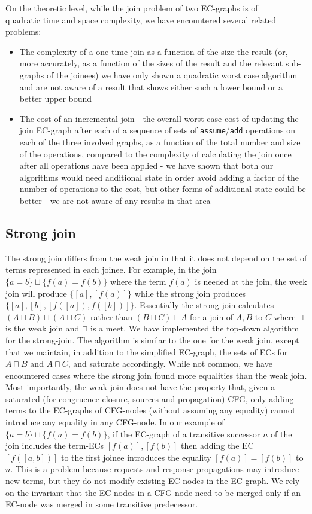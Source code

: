 On the theoretic level, while the join problem of two EC-graphs is of \\ quadratic time and space complexity, 
we have encountered several related problems:

\begin{itemize}
	\item The complexity of a one-time join as a function of the size the result (or, more accurately, as a function of the sizes of the result and the relevant sub-graphs of the joinees) we have only shown a quadratic worst case algorithm and are not aware of a result that shows either such a lower bound or a better upper bound
	\item The cost of an incremental join - the overall worst case cost of updating the join EC-graph after each of a sequence of sets of \lstinline{assume}/\lstinline{add} operations on each of the three involved graphs, as a function of the total number and size of the operations, compared to the complexity of calculating the join once after all operations have been applied - we have shown that both our algorithms would need additional state in order avoid adding a factor of the number of operations to the cost, 
	but other forms of additional state could be better - we are not aware of any results in that area
\end{itemize}

\newpage
\subsection{Strong join}
The strong join differs from the weak join in that it does not depend on the set of terms represented in each joinee.
For example, in the join $\{a=b\}\sqcup\{f(a)=f(b)\}$ where the term $f(a)$ is needed at the join, the week join will produce $\{[a],[f(a)]\}$ while the strong join produces $\{[a],[b],[f([a]),f([b])]\}$. Essentially the strong join calculates $(A\sqcap B) \sqcup (A\sqcap C)$ rather than $(B\sqcup C) \sqcap A$ for a join of $A,B$ to $C$ where $\sqcup$ is the weak join and $\sqcap$ is a meet.
We have implemented the top-down algorithm for the strong-join. The algorithm is similar to the one for the weak join, except that we maintain, in addition to the simplified EC-graph, the sets of ECs for $A\sqcap B$ and $A\sqcap C$, and saturate accordingly.
While not common, we have encountered cases where the strong join found more equalities than the weak join.
Most importantly, the weak join does not have the property that, given a saturated (for congruence closure, sources and propagation) CFG,
only adding terms to the EC-graphs of CFG-nodes (without assuming any equality) cannot introduce any equality in any CFG-node.
In our example of $\{a=b\}\sqcup\{f(a)=f(b)\}$, if the EC-graph of a transitive successor $n$ of the join includes the term-ECs $[f(a)],[f(b)]$ then adding the EC $[f([a,b])]$ to the first joinee introduces the equality $[f(a)]=[f(b)]$ to $n$. 
This is a problem because requests and response propagations may introduce new terms, but they do not modify existing EC-nodes in the EC-graph. 
We rely on the invariant that the EC-nodes in a CFG-node need to be merged only if an EC-node was merged in some transitive predecessor.

